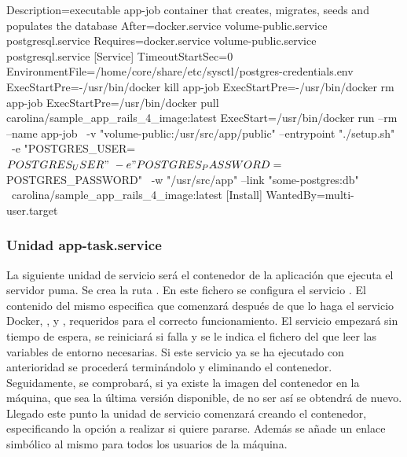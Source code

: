 \begin{codelisting}
\label{code:app-job.service}
\begin{code}
[Unit] 
  Description=executable app-job container that creates, migrates, seeds and 
              populates the database
  After=docker.service volume-public.service postgresql.service
  Requires=docker.service volume-public.service postgresql.service
[Service] 
  TimeoutStartSec=0 
  EnvironmentFile=/home/core/share/etc/sysctl/postgres-credentials.env
  ExecStartPre=-/usr/bin/docker kill app-job 
  ExecStartPre=-/usr/bin/docker rm app-job 
  ExecStartPre=/usr/bin/docker pull carolina/sample_app_rails_4_image:latest 
  ExecStart=/usr/bin/docker run --rm --name app-job \
  -v "volume-public:/usr/src/app/public" --entrypoint "./setup.sh" \
  -e "POSTGRES_USER=${POSTGRES_USER}" \
  -e "POSTGRES_PASSWORD=${POSTGRES_PASSWORD}" \
  -w "/usr/src/app" --link "some-postgres:db" \
  carolina/sample_app_rails_4_image:latest
[Install] 
  WantedBy=multi-user.target
\end{code}
\end{codelisting}

\subsubsection{Unidad app-task.service}

La siguiente unidad de servicio será el contenedor de la aplicación que ejecuta el servidor puma. Se crea la ruta . En este fichero se configura el servicio . El contenido del mismo especifica que comenzará después de que lo haga el servicio Docker, ,  y , requeridos para el correcto funcionamiento. El servicio empezará  sin tiempo de espera, se reiniciará si falla y se le indica el fichero del que leer las variables de entorno necesarias. Si este servicio ya se ha ejecutado con anterioridad se procederá terminándolo y eliminando el contenedor. Seguidamente, se comprobará, si ya existe la imagen del contenedor en la máquina, que sea la última versión disponible, de no ser así se obtendrá de nuevo. Llegado este punto la unidad de servicio comenzará creando el contenedor, especificando la opción a realizar si quiere pararse. Además se añade un enlace simbólico al mismo para todos los usuarios de la máquina. 

